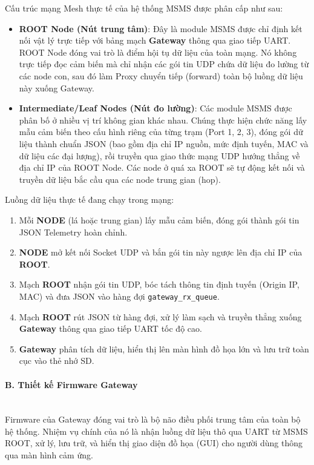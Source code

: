 \documentclass{article} %
\begin{document}
Cấu trúc mạng Mesh thực tế của hệ thống MSMS được phân cấp như sau:
\begin{itemize}
    \item \textbf{ROOT Node (Nút trung tâm)}: Đây là module MSMS được chỉ định kết nối vật lý trực tiếp với bảng mạch \textbf{Gateway} thông qua giao tiếp UART. ROOT Node đóng vai trò là điểm hội tụ dữ liệu của toàn mạng. Nó không trực tiếp đọc cảm biến mà chỉ nhận các gói tin UDP chứa dữ liệu đo lường từ các node con, sau đó làm Proxy chuyển tiếp (forward) toàn bộ luồng dữ liệu này xuống Gateway.
    \item \textbf{Intermediate/Leaf Nodes (Nút đo lường)}: Các module MSMS được phân bố ở nhiều vị trí không gian khác nhau. Chúng thực hiện chức năng lấy mẫu cảm biến theo cấu hình riêng của từng trạm (Port 1, 2, 3), đóng gói dữ liệu thành chuẩn JSON (bao gồm địa chỉ IP nguồn, mức định tuyến, MAC và dữ liệu các đại lượng), rồi truyền qua giao thức mạng UDP hướng thẳng về địa chỉ IP của ROOT Node. Các node ở quá xa ROOT sẽ tự động kết nối và truyền dữ liệu bắc cầu qua các node trung gian (hop).
\end{itemize}

Luồng dữ liệu thực tế đang chạy trong mạng:
\begin{enumerate}
    \item Mỗi \textbf{NODE} (lá hoặc trung gian) lấy mẫu cảm biến, đóng gói thành gói tin JSON Telemetry hoàn chỉnh.
    \item \textbf{NODE} mở kết nối Socket UDP và bắn gói tin này ngược lên địa chỉ IP của \textbf{ROOT}.
    \item Mạch \textbf{ROOT} nhận gói tin UDP, bóc tách thông tin định tuyến (Origin IP, MAC) và đưa JSON vào hàng đợi \texttt{gateway\_rx\_queue}.
    \item Mạch \textbf{ROOT} rút JSON từ hàng đợi, xử lý làm sạch và truyền thẳng xuống \textbf{Gateway} thông qua giao tiếp UART tốc độ cao.
    \item \textbf{Gateway} phân tích dữ liệu, hiển thị lên màn hình đồ họa lớn và lưu trữ toàn cục vào thẻ nhớ SD.
\end{enumerate}

\paragraph{B. Thiết kế Firmware Gateway} \mbox{}\\

Firmware của Gateway đóng vai trò là bộ não điều phối trung tâm của toàn bộ hệ thống. Nhiệm vụ chính của nó là nhận luồng dữ liệu thô qua UART từ MSMS ROOT, xử lý, lưu trữ, và hiển thị giao diện đồ họa (GUI) cho người dùng thông qua màn hình cảm ứng.
\end{document}
